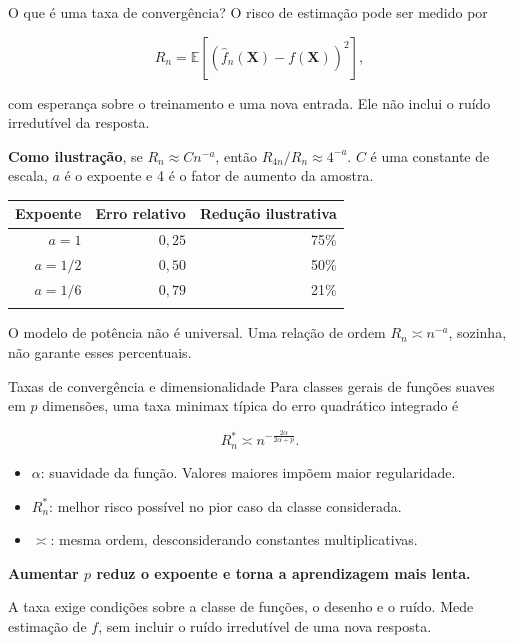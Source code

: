 \documentclass[
  10pt,
  ignorenonframetext,
  aspectratio=169,
  brazilian,
]{beamer}
\newcounter{none} %
\providecommand{\tightlist}{%
  \setlength{\itemsep}{0pt}\setlength{\parskip}{0pt}}
\begin{document}
\begin{frame}{O que é uma taxa de convergência?}
\protect{}\label{o-que-uxe9-uma-taxa-de-converguxeancia}
O risco de estimação pode ser medido por

\[
R_n=\mathbb E[(\hat f_n(\mathbf X)-f(\mathbf X))^2],
\]

com esperança sobre o treinamento e uma nova entrada. Ele não inclui o
ruído irredutível da resposta.

\textbf{Como ilustração}, se \(R_n\approx Cn^{-a}\), então
\(R_{4n}/R_n\approx4^{-a}\). \(C\) é uma constante de escala, \(a\) é o
expoente e 4 é o fator de aumento da amostra.

{\def\LTcaptype{none} %
\begin{longtable}[]{@{}rrr@{}}
\toprule\noalign{}
Expoente & Erro relativo & Redução ilustrativa \\
\midrule\noalign{}
\endhead
\(a=1\) & \(0{,}25\) & 75\% \\
\(a=1/2\) & \(0{,}50\) & 50\% \\
\(a=1/6\) & \(0{,}79\) & 21\% \\
\bottomrule\noalign{}
\end{longtable}
}

O modelo de potência não é universal. Uma relação de ordem
\(R_n\asymp n^{-a}\), sozinha, não garante esses percentuais.
\end{frame}

\begin{frame}{Taxas de convergência e dimensionalidade}
\protect{}\label{taxas-de-converguxeancia-e-dimensionalidade}
Para classes gerais de funções suaves em \(p\) dimensões, uma taxa
minimax típica do erro quadrático integrado é

\[
\boxed{R_n^*\asymp n^{-\frac{2\alpha}{2\alpha+p}}.}
\]

\begin{itemize}
\tightlist
\item
  \(\alpha\): suavidade da função. Valores maiores impõem maior
  regularidade.
\item
  \(R_n^*\): melhor risco possível no pior caso da classe considerada.
\item
  \(\asymp\): mesma ordem, desconsiderando constantes multiplicativas.
\end{itemize}

\textbf{Aumentar \(p\) reduz o expoente e torna a aprendizagem mais
lenta.}

A taxa exige condições sobre a classe de funções, o desenho e o ruído.
Mede estimação de \(f\), sem incluir o ruído irredutível de uma nova
resposta.

\end{frame}
\end{document}
